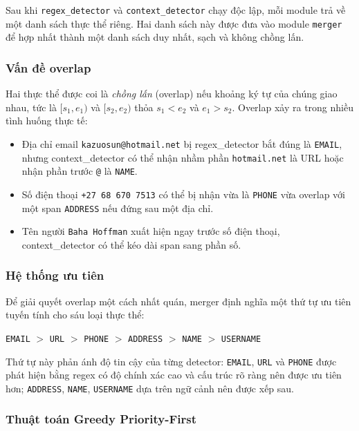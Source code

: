 Sau khi \texttt{regex\_detector} và \texttt{context\_detector} chạy độc lập,
mỗi module trả về một danh sách thực thể riêng. Hai danh sách này được đưa vào
module \texttt{merger} để hợp nhất thành một danh sách duy nhất, sạch và
không chồng lấn.

\subsubsection{Vấn đề overlap}

Hai thực thể được coi là \textit{chồng lấn} (overlap) nếu khoảng ký tự của
chúng giao nhau, tức là $[s_1, e_1)$ và $[s_2, e_2)$ thỏa $s_1 < e_2$ và
$e_1 > s_2$. Overlap xảy ra trong nhiều tình huống thực tế:

\begin{itemize}[nosep]
    \item Địa chỉ email \texttt{kazuosun@hotmail.net} bị regex\_detector bắt
          đúng là \texttt{EMAIL}, nhưng context\_detector có thể nhận nhầm
          phần \texttt{hotmail.net} là URL hoặc nhận phần trước \texttt{@} là
          \texttt{NAME}.
    \item Số điện thoại \texttt{+27 68 670 7513} có thể bị nhận vừa là
          \texttt{PHONE} vừa overlap với một span \texttt{ADDRESS} nếu đứng
          sau một địa chỉ.
    \item Tên người \texttt{Baha Hoffman} xuất hiện ngay trước số điện thoại,
          context\_detector có thể kéo dài span sang phần số.
\end{itemize}

\subsubsection{Hệ thống ưu tiên}

Để giải quyết overlap một cách nhất quán, merger định nghĩa một thứ tự ưu tiên
tuyến tính cho sáu loại thực thể:

\begin{center}
\texttt{EMAIL} $>$ \texttt{URL} $>$ \texttt{PHONE} $>$
\texttt{ADDRESS} $>$ \texttt{NAME} $>$ \texttt{USERNAME}
\end{center}

Thứ tự này phản ánh độ tin cậy của từng detector: \texttt{EMAIL}, \texttt{URL}
và \texttt{PHONE} được phát hiện bằng regex có độ chính xác cao và cấu trúc
rõ ràng nên được ưu tiên hơn; \texttt{ADDRESS}, \texttt{NAME},
\texttt{USERNAME} dựa trên ngữ cảnh nên được xếp sau.

\subsubsection{Thuật toán Greedy Priority-First}

